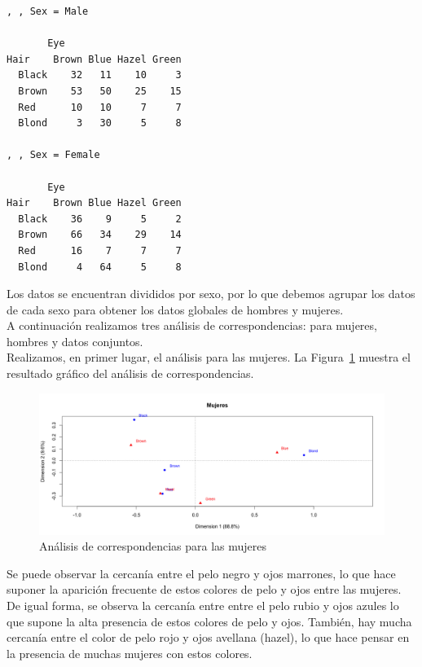 \documentclass[12pt,a4paper,twoside,openright,titlepage,final]{article}
\begin{document}
\begin{verbatim}
, , Sex = Male

       Eye
Hair    Brown Blue Hazel Green
  Black    32   11    10     3
  Brown    53   50    25    15
  Red      10   10     7     7
  Blond     3   30     5     8

, , Sex = Female

       Eye
Hair    Brown Blue Hazel Green
  Black    36    9     5     2
  Brown    66   34    29    14
  Red      16    7     7     7
  Blond     4   64     5     8

\end{verbatim}

Los datos se encuentran divididos por sexo, por lo que debemos agrupar los datos de cada sexo para obtener los datos globales de hombres y mujeres.\\

A continuación realizamos tres análisis de correspondencias: para mujeres, hombres y datos conjuntos.\\

Realizamos, en primer lugar, el análisis para las mujeres. La Figura~\ref{fig:mujeres_ca} muestra el resultado gráfico del análisis de correspondencias.\\

\begin{figure}[tbph!]
\centering
\includegraphics[width=\linewidth]{imagenes/mujeres_ca}
\caption{Análisis de correspondencias para las mujeres}
\label{fig:mujeres_ca}
\end{figure}

Se puede observar la cercanía entre el pelo negro y ojos marrones, lo que hace suponer la aparición frecuente de estos colores de pelo y ojos entre las mujeres. De igual forma, se observa la cercanía entre entre el pelo rubio y ojos azules lo que supone la alta presencia de estos colores de pelo y ojos. También, hay mucha cercanía entre el color de pelo rojo y ojos avellana (hazel), lo que hace pensar en la presencia de muchas mujeres con estos colores.\\
\end{document}
